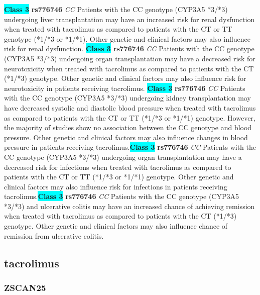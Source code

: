 \documentclass{book}
\begin{document}
\begin{center}
\textbf{\colorbox{cyan} {Class 3}} \textbf{ rs776746 } \textit{ CC }
Patients with the CC genotype (CYP3A5 *3/*3) undergoing liver transplantation may have an increased risk for renal dysfunction when treated with tacrolimus as compared to patients with the CT or TT genotype (*1/*3 or *1/*1). Other genetic and clinical factors may also influence risk for renal dysfunction. \textbf{\colorbox{cyan} {Class 3}} \textbf{ rs776746 } \textit{ CC }
Patients with the CC genotype (CYP3A5 *3/*3) undergoing organ transplantation may have a decreased risk for neurotoxicity when treated with tacrolimus as compared to patients with the CT (*1/*3) genotype. Other genetic and clinical factors may also influence risk for neurotoxicity in patients receiving tacrolimus. \textbf{\colorbox{cyan} {Class 3}} \textbf{ rs776746 } \textit{ CC }
Patients with the CC genotype (CYP3A5 *3/*3) undergoing kidney transplantation may have decreased systolic and diastolic blood pressure when treated with tacrolimus as compared to patients with the CT or TT (*1/*3 or *1/*1) genotype. However, the majority of studies show no association between the CC genotype and blood pressure. Other genetic and clinical factors may also influence changes in blood pressure in patients receiving tacrolimus.\textbf{\colorbox{cyan} {Class 3}} \textbf{ rs776746 } \textit{ CC }
Patients with the CC genotype (CYP3A5 *3/*3) undergoing organ transplantation may have a decreased risk for infections when treated with tacrolimus as compared to patients with the CT or TT (*1/*3 or *1/*1) genotype. Other genetic and clinical factors may also influence risk for infections in patients receiving tacrolimus.\textbf{\colorbox{cyan} {Class 3}} \textbf{ rs776746 } \textit{ CC }
Patients with the CC genotype (CYP3A5 *3/*3) and ulcerative colitis may have an increased chance of achieving remission when treated with tacrolimus as compared to patients with the CT (*1/*3) genotype. Other genetic and clinical factors may also influence chance of remission from ulcerative colitis. 


\end{center}\subsection{ tacrolimus }


\subsubsection{ ZSCAN25 }
\end{document}
